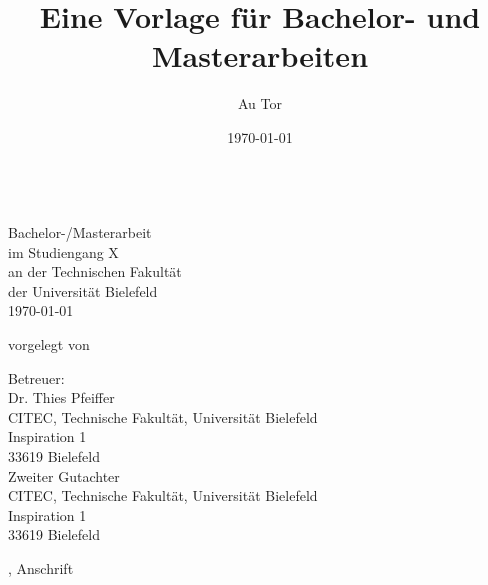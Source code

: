 \begin{titlepage}

\title{Eine Vorlage für Bachelor- und Masterarbeiten}
\author{Au Tor}
\date{\today}

\dimendef{}
\begin{center}
\thispagestyle{empty}

{\fontsize{24.88}{28}
 \thetitle\\[0.5cm]
}
\fontsize{12}{12}
\vspace{1cm}
Bachelor-/Masterarbeit\\
im Studiengang X\\
an der Technischen Fakultät\\
der Universität Bielefeld\\

\vspace{1.5cm} \today

\vspace{1cm}
vorgelegt von\\
\theauthor

\vspace{3cm}
Betreuer:\\
Dr. Thies Pfeiffer\\
CITEC, Technische Fakultät, Universität Bielefeld\\
Inspiration 1\\
33619 Bielefeld\\
\vspace{.2cm}
Zweiter Gutachter\\
CITEC, Technische Fakultät, Universität Bielefeld\\
Inspiration 1\\
33619 Bielefeld


\vspace{2cm}
{\small \theauthor, Anschrift}
\end{center}
\end{titlepage}
